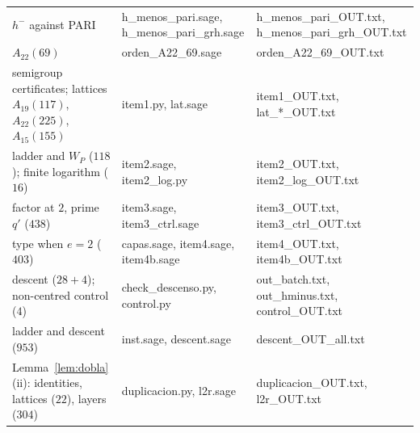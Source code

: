 \documentclass[11pt,a4paper]{article}
\theoremstyle{definition}
\begin{document}
\begin{center}
\begin{tabular}{p{}p{}p{}}
$h^-$ against PARI & {\ttfamily\footnotesize h\_menos\_pari.sage, h\_menos\_pari\_grh.sage} & {\ttfamily\footnotesize h\_menos\_pari\_OUT.txt, \allowbreak h\_menos\_pari\_grh\_OUT.txt} \\
$A_{22}(69)$ & {\ttfamily\footnotesize orden\_A22\_69.sage} & {\ttfamily\footnotesize orden\_A22\_69\_OUT.txt} \\
semigroup certificates; lattices $A_{19}(117)$, $A_{22}(225)$, $A_{15}(155)$ & {\ttfamily\footnotesize item1.py, lat.sage} & {\ttfamily\footnotesize item1\_OUT.txt, \allowbreak lat\_*\_OUT.txt} \\
ladder and $W_P$ ($118$); finite logarithm ($16$) & {\ttfamily\footnotesize item2.sage, item2\_log.py} & {\ttfamily\footnotesize item2\_OUT.txt, \allowbreak item2\_log\_OUT.txt} \\
factor at $2$, prime $q'$ ($438$) & {\ttfamily\footnotesize item3.sage, item3\_ctrl.sage} & {\ttfamily\footnotesize item3\_OUT.txt, \allowbreak item3\_ctrl\_OUT.txt} \\
type when $e=2$ ($403$) & {\ttfamily\footnotesize capas.sage, item4.sage, item4b.sage} & {\ttfamily\footnotesize item4\_OUT.txt, \allowbreak item4b\_OUT.txt} \\
descent ($28+4$); non-centred control ($4$) & {\ttfamily\footnotesize check\_descenso.py, control.py} & {\ttfamily\footnotesize out\_batch.txt, \allowbreak out\_hminus.txt, \allowbreak control\_OUT.txt} \\
ladder and descent ($953$) & {\ttfamily\footnotesize inst.sage, descent.sage} & {\ttfamily\footnotesize descent\_OUT\_all.txt} \\
Lemma~\ref{lem:dobla}(ii): identities, lattices ($22$), layers ($304$) & {\ttfamily\footnotesize duplicacion.py, l2r.sage} & {\ttfamily\footnotesize duplicacion\_OUT.txt, \allowbreak l2r\_OUT.txt} \\
\bottomrule
\end{tabular}
\end{center}
\end{document}
